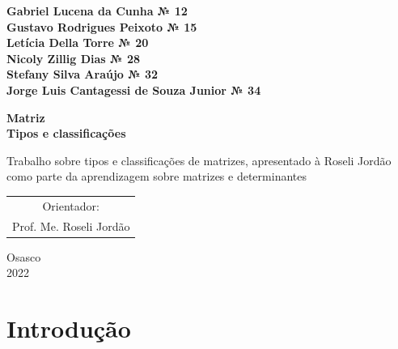 \documentclass[a4paper,12pt]{article}
\begin{document}
\begin{titlepage}

    \begin{center}
        
        \Large \textbf{Gabriel Lucena da Cunha № 12 \\ Gustavo Rodrigues Peixoto № 15 \\ Letícia Della Torre № 20 \\ Nicoly Zillig Dias № 28 \\ Stefany Silva Araújo № 32 \\ Jorge Luis Cantagessi de Souza Junior № 34}
        
        \vspace{3 cm}
        \Large \textbf{Matriz} \\
        \textbf{Tipos e classificações}
        
    \end{center}
    
    \vspace{3 cm}
    
    \hfill \parbox{8 cm}{Trabalho sobre tipos e classificações de matrizes, apresentado à Roseli Jordão como parte da aprendizagem sobre matrizes e determinantes}
    
    \vspace{3 cm}
    
    \begin{table}[htb!]
        \centering
        \begin{tabular}{c}
             Orientador: \\
             Prof. Me. Roseli Jordão 
        \end{tabular}
    \end{table}
    
    \begin{center}
        \vspace{2.5 cm}
        Osasco \\
        2022
    \end{center}

\end{titlepage}


\thispagestyle{empty}
\tableofcontents
\thispagestyle{empty}
\pagebreak 



\section*{Introdução}
\end{document}
